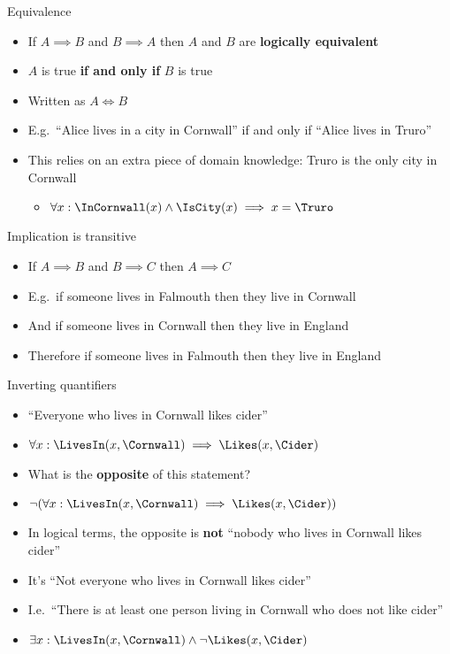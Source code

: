 \begin{frame}{Equivalence}
	\begin{itemize}
		\pause\item If $A \implies B$ and $B \implies A$ then $A$ and $B$ are \textbf{logically equivalent}
		\pause\item $A$ is true \textbf{if and only if} $B$ is true
		\pause\item Written as $A \iff B$
		\pause\item E.g.\ ``Alice lives in a city in Cornwall'' if and only if ``Alice lives in Truro''
		\pause\item This relies on an extra piece of domain knowledge: Truro is the only city in Cornwall
			\begin{itemize}
				\pause\item $\forall x : \InCornwall(x) \wedge \IsCity(x) \implies x = \Truro$
			\end{itemize}
	\end{itemize}
\end{frame}

\begin{frame}{Implication is transitive}
	\begin{itemize}
		\pause\item If $A \implies B$ and $B \implies C$ then $A \implies C$
		\pause\item E.g.\ if someone lives in Falmouth then they live in Cornwall
		\pause\item And if someone lives in Cornwall then they live in England
		\pause\item Therefore if someone lives in Falmouth then they live in England
	\end{itemize}
\end{frame}

\begin{frame}{Inverting quantifiers}
	\begin{itemize}
		\pause\item ``Everyone who lives in Cornwall likes cider''
		\pause\item $\forall x : \LivesIn(x, \Cornwall) \implies \Likes(x, \Cider)$
		\pause\item What is the \textbf{opposite} of this statement?
		\pause\item $\neg( \forall x : \LivesIn(x, \Cornwall) \implies \Likes(x, \Cider) )$
		\pause\item In logical terms, the opposite is \textbf{not} ``nobody who lives in Cornwall likes cider''
		\pause\item It's ``Not everyone who lives in Cornwall likes cider''
		\pause\item I.e.\ ``There is at least one person living in Cornwall who does not like cider''
		\pause\item $\exists x : \LivesIn(x, \Cornwall) \wedge \neg \Likes(x, \Cider)$
	\end{itemize}
\end{frame}
